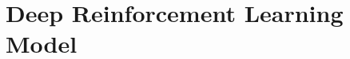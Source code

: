 \documentclass[12pt, a4paper, oneside]{book}
\begin{document}








\part{Deep Reinforcement Learning Model}







\end{document}
